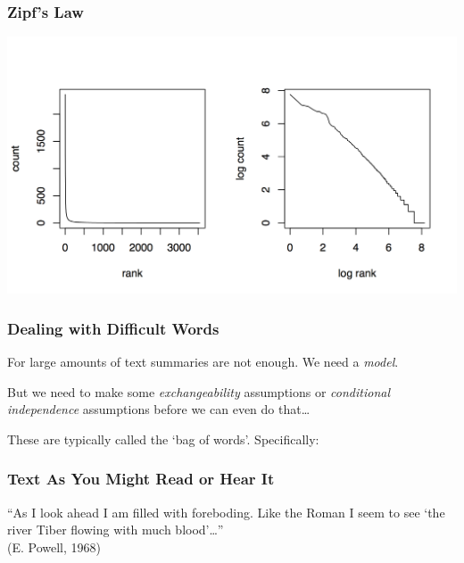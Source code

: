 \documentclass[11pt,compress,professionalfonts]{beamer}
\begin{document}
\begin{frame}[t]\frametitle{Zipf's Law}

\begin{center}
\includegraphics[scale=1.2]{pictures/zipfy}
\end{center}


\end{frame}
\begin{frame}[t]\frametitle{Dealing with Difficult Words}

For large amounts of text summaries are not enough. We need a \textit{model}.

But we need to make some \textsl{exchangeability} assumptions or
\textit{conditional independence} assumptions before we can even do that\ldots


These are typically called the `bag of words'.  Specifically:

\end{frame}
\begin{frame}[t]\frametitle{Text As You Might Read or Hear It}

``As I look ahead I am filled with foreboding.  Like the Roman I seem to see `the river Tiber flowing with much blood'\ldots ''\\
(E. Powell, 1968)


\end{frame}
\end{document}
